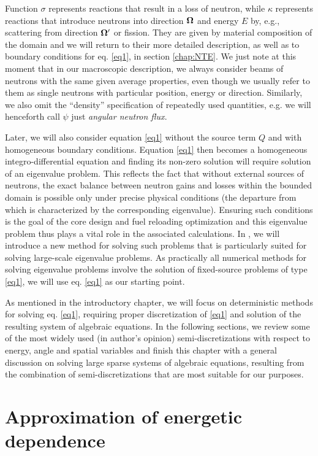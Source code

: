 Function $\sigma$ represents reactions that result in a loss of neutron, while $\kappa$ represents reactions that
introduce neutrons into direction $\mathbf{\Omega}$ and energy $E$ by, e.g., scattering from direction $\mathbf{\Omega}'$ or fission. 
They are given by material composition of the domain and we will return to their more detailed description, as
well as to boundary conditions for eq. \eqref{eq1}, in section \ref{chap:NTE}. We just note at this moment that in our macroscopic
description, we always consider beams of neutrons with the same given average properties, even though we usually refer
to them as single neutrons with particular position, energy or direction. Similarly, we also omit the ``density''
specification of repeatedly used quantities, e.g. we will henceforth call $\psi$ just \textit{angular neutron flux}.

Later, we will also consider equation \eqref{eq1} without the source term $Q$ and with homogeneous boundary conditions.
Equation \eqref{eq1} then becomes a homogeneous integro-differential equation and finding its non-zero
solution will require solution of an eigenvalue problem. This reflects the fact that without external sources of neutrons, the exact balance between neutron gains and
losses within the bounded domain is possible only under precise physical conditions (the departure from which is
characterized by the corresponding eigenvalue). Ensuring such conditions is the goal of the core design and fuel
reloading optimization and this eigenvalue problem thus plays a vital role in the associated calculations. In
, we will introduce a new method for solving such problems that is particularly suited for solving
large-scale eigenvalue problems. As practically all numerical methods for solving eigenvalue problems involve the
solution of fixed-source problems of type \eqref{eq1}, we will use eq. \eqref{eq1} as our starting point.

As mentioned in the introductory chapter, we will focus on deterministic methods for solving eq. \eqref{eq1}, requiring
proper discretization of \eqref{eq1} and solution of the resulting system of algebraic equations.
In the following sections, we review some of the most widely used (in author's opinion) semi-discretizations with respect to
energy, angle and spatial variables and finish this chapter with a general discussion on solving large sparse systems of
algebraic equations, resulting from the combination of semi-discretizations that are most suitable for our purposes.

\section{Approximation of energetic dependence}

